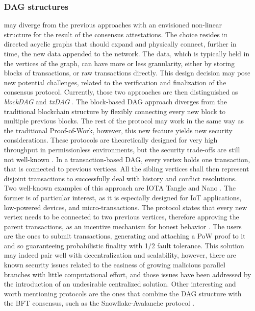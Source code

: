 \documentclass[journal]{IEEEtran}
\begin{document}
\subsubsection{DAG structures} may diverge from the previous approaches with an envisioned 
non-linear structure for the result of the consensus attestations. The choice resides in 
directed acyclic graphs that should expand and physically connect, further in time, the new
data appended to the network. The data, which is typically held in the vertices of the graph, 
can have more or less granularity, either by storing blocks of transactions, or raw transactions directly.
This design decision may pose new potential challenges, related to the verification and finalization of
the consensus protocol. Currently, those two approaches are then distinguished as \emph{blockDAG} and 
\emph{txDAG} \cite{survey-dist-consensus}. 
The block-based DAG approach diverges from the traditional blockchain structure by flexibly 
connecting every new block to multiple previous blocks. The rest of the protocol may work in the same way 
as the traditional Proof-of-Work, however, this new feature yields new security considerations. These protocols
are theoretically designed for very high throughput in permissionless environments, but the security trade-offs
are still not well-known \cite{sompolinsky2018phantom}.
In a transaction-based DAG, every vertex holds one transaction, that is connected to previous vertices. 
All the sibling vertices shall then represent disjoint transactions to successfully deal with history and conflict
resolutions. Two well-known examples of this approach are IOTA Tangle \cite{popov2018tangle} 
and Nano \cite{lemahieu2018nano}.
The former is of particular interest, as it is especially designed for IoT applications, low-powered devices, and
micro-transactions. The protocol states that every new vertex needs to be connected to two previous vertices, 
therefore approving the parent transactions, as an incentive mechanism for honest behavior \cite{survey-dist-consensus}. 
The users are the ones to submit transactions, generating and attaching a PoW proof to it and 
so guaranteeing probabilistic finality with 1/2 fault tolerance. This solution may indeed pair well with 
decentralization and scalability, however, there are known security issues related to the
easiness of growing malicious parallel branches with little computational effort, and those issues have been 
addressed by the introduction of an undesirable centralized solution. 
Other interesting and worth mentioning protocols are the ones that combine the DAG structure with the BFT consensus, 
such as the Snowflake-Avalanche protocol \cite{rocket2018snowflake}.
\end{document}
